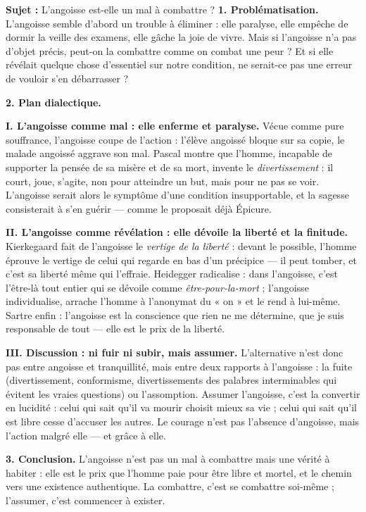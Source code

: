 \documentclass[11pt]{article}
\newcommand{\cle}[1]{{\popxbold\color{popdark}#1}}
\begin{document}
\begin{exoresolu}
\textbf{Sujet :} L'angoisse est-elle un mal à combattre ?
\tcblower
\textbf{1. Problématisation.} L'angoisse semble d'abord un trouble à éliminer : elle paralyse, elle empêche de dormir la veille des examens, elle gâche la joie de vivre. Mais si l'angoisse n'a pas d'objet précis, peut-on la combattre comme on combat une peur ? Et si elle révélait quelque chose d'essentiel sur notre condition, ne serait-ce pas une erreur de vouloir s'en débarrasser ?

\textbf{2. Plan dialectique.}

\textbf{I. L'angoisse comme mal : elle enferme et paralyse.} Vécue comme pure souffrance, l'angoisse coupe de l'action : l'élève angoissé bloque sur sa copie, le malade angoissé aggrave son mal. Pascal montre que l'homme, incapable de supporter la pensée de sa misère et de sa mort, invente le \emph{divertissement} : il court, joue, s'agite, non pour atteindre un but, mais pour ne pas se voir. L'angoisse serait alors le symptôme d'une condition insupportable, et la sagesse consisterait à s'en guérir — comme le proposait déjà Épicure.

\textbf{II. L'angoisse comme révélation : elle dévoile la liberté et la finitude.} Kierkegaard fait de l'angoisse le \emph{vertige de la liberté} : devant le possible, l'homme éprouve le vertige de celui qui regarde en bas d'un précipice — il peut tomber, et c'est sa liberté même qui l'effraie. Heidegger radicalise : dans l'angoisse, c'est l'être-là tout entier qui se dévoile comme \emph{être-pour-la-mort} ; l'angoisse individualise, arrache l'homme à l'anonymat du « on » et le rend à lui-même. Sartre enfin : l'angoisse est la conscience que rien ne me détermine, que je suis responsable de tout — elle est le prix de la liberté.

\textbf{III. Discussion : ni fuir ni subir, mais assumer.} L'alternative n'est donc pas entre angoisse et tranquillité, mais entre deux rapports à l'angoisse : la fuite (divertissement, conformisme, divertissements des palabres interminables qui évitent les vraies questions) ou l'assomption. Assumer l'angoisse, c'est la convertir en lucidité : celui qui sait qu'il va mourir choisit mieux sa vie ; celui qui sait qu'il est libre cesse d'accuser les autres. Le \cle{courage} n'est pas l'absence d'angoisse, mais l'action malgré elle — et grâce à elle.

\textbf{3. Conclusion.} L'angoisse n'est pas un mal à combattre mais une vérité à habiter : elle est le prix que l'homme paie pour être libre et mortel, et le chemin vers une existence authentique. La combattre, c'est se combattre soi-même ; l'assumer, c'est commencer à exister.
\end{exoresolu}
\end{document}
